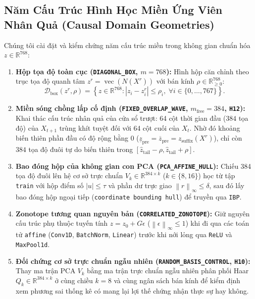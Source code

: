 \documentclass[11pt,a4paper]{article}
\newcommand{\R}{\mathbb{R}}
\newcommand{\norm}[1]{\left\lVert #1\right\rVert}
\newcommand{\abs}[1]{\left\lvert #1\right\rvert}
\newcommand{\code}[1]{{\small\ttfamily\nolinkurl{#1}}}
\newcommand{\vecop}{\operatorname{vec}}
\newcommand{\Dset}{\mathcal{D}}
\theoremstyle{remark}
\begin{document}
\subsection{Năm Cấu Trúc Hình Học Miền Ứng Viên Nhân Quả (Causal Domain Geometries)}
Chúng tôi cài đặt và kiểm chứng năm cấu trúc miền trong không gian chuẩn hóa $z \in \R^{768}$:
\begin{enumerate}
  \item \textbf{Hộp tọa độ toàn cục (\code{DIAGONAL\_BOX}, $m=768$):}
  Hình hộp căn chỉnh theo trục tọa độ quanh tâm $z^r = \vecop(N(X^r))$ với bán kính $\rho \in \R^{768}_{\ge 0}$:
  \begin{equation}
    \Dset_{\text{box}}(z^r, \rho) = \left\{ z \in \R^{768} : \abs{z_i - z^r_i} \le \rho_i, \; \forall i \in \{0,\dots,767\} \right\}.
  \end{equation}
  \item \textbf{Miền sóng chồng lấp cố định (\code{FIXED\_OVERLAP\_WAVE}, $m_{\text{free}}=384$, \code{H12}):}
  Khai thác cấu trúc nhân quả của cửa sổ trượt: 64 cột thời gian đầu ($384$ tọa độ) của $X_{t+1}$ trùng khít tuyệt đối với 64 cột cuối của $X_t$. Nhờ đó khoảng biến thiên phần đầu có độ rộng bằng 0 ($\underline{z}_{\text{pre}} = \overline{z}_{\text{pre}} = z_{\text{suffix}}(X^r)$), chỉ còn $384$ tọa độ đuôi tự do biến thiên trong $[\hat{z}_{\text{tail}} - \rho, \hat{z}_{\text{tail}} + \rho]$.
  \item \textbf{Bao đóng hộp của không gian con PCA (\code{PCA\_AFFINE\_HULL}):}
  Chiếu 384 tọa độ đuôi lên hệ cơ sở trực chuẩn $V_k \in \R^{384 \times k}$ ($k \in \{8, 16\}$) học từ tập \code{train} với hộp điểm số $\abs{u} \le \tau$ và phần dư trực giao $\norm{r}_\infty \le \delta$, sau đó lấy bao đóng hộp ngoại tiếp (\code{coordinate bounding hull}) để truyền qua \code{IBP}.
  \item \textbf{Zonotope tương quan nguyên bản (\code{CORRELATED\_ZONOTOPE}):}
  Giữ nguyên cấu trúc phụ thuộc tuyến tính $z = z_0 + G \epsilon$ ($\norm{\epsilon}_\infty \le 1$) khi đi qua các toán tử \code{affine} (\code{Conv1D}, \code{BatchNorm}, \code{Linear}) trước khi nới lỏng qua \code{ReLU} và \code{MaxPool1d}.
  \item \textbf{Đối chứng cơ sở trực chuẩn ngẫu nhiên (\code{RANDOM\_BASIS\_CONTROL}, \code{H10}):}
  Thay ma trận PCA $V_k$ bằng ma trận trực chuẩn ngẫu nhiên phân phối Haar $Q_k \in \R^{384 \times k}$ ở cùng chiều $k=8$ và cùng ngân sách bán kính để kiểm định xem phương sai thống kê có mang lại lợi thế chứng nhận thực sự hay không.
\end{enumerate}
\end{document}
